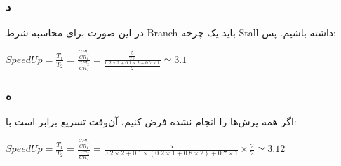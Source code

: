 \subsubsection*{د}

در این صورت برای محاسبه شرط Branch باید یک چرخه Stall داشته باشیم. پس:

\setLTR
$
SpeedUp = \frac{T_1}{T_2} = \frac{\frac{CPI_1}{CR_1}}{\frac{CPI_2}{CR_2}} = \frac{\frac{5}{2.5}}{\frac{0.2\times2 + 0.1\times2+0.7\times1}{2}} \simeq 3.1
$
\setRTL

\pagebreak

\subsubsection*{ه}

اگر همه پرش‌ها را انجام نشده فرض کنیم، آن‌وقت تسریع برابر است با:

\setLTR
$
SpeedUp = \frac{T_1}{T_2} = \frac{\frac{CPI_1}{CR_1}}{\frac{CPI_2}{CR_2}} = \frac{5}{0.2\times2+0.1\times(0.2\times1+0.8\times2)+0.7\times1} \times \frac{2}{2} \simeq 3.12
$
\setRTL


